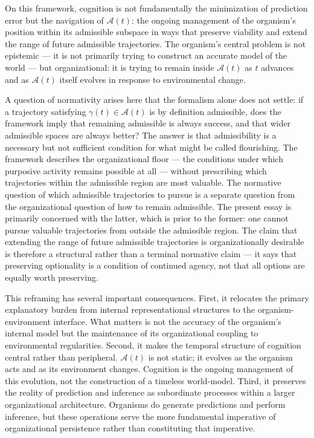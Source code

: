 \documentclass[12pt,a4paper]{report}
\theoremstyle{flyxion}
\begin{document}
On this framework, cognition is not fundamentally the minimization of prediction error but the navigation of $\mathcal{A}(t)$: the ongoing management of the organism's position within its admissible subspace in ways that preserve viability and extend the range of future admissible trajectories. The organism's central problem is not epistemic --- it is not primarily trying to construct an accurate model of the world --- but organizational: it is trying to remain inside $\mathcal{A}(t)$ as $t$ advances and as $\mathcal{A}(t)$ itself evolves in response to environmental change.

A question of normativity arises here that the formalism alone does not settle: if a trajectory satisfying $\gamma(t) \in \mathcal{A}(t)$ is by definition admissible, does the framework imply that remaining admissible is always success, and that wider admissible spaces are always better? The answer is that admissibility is a necessary but not sufficient condition for what might be called flourishing. The framework describes the organizational floor --- the conditions under which purposive activity remains possible at all --- without prescribing which trajectories within the admissible region are most valuable. The normative question of which admissible trajectories to pursue is a separate question from the organizational question of how to remain admissible. The present essay is primarily concerned with the latter, which is prior to the former: one cannot pursue valuable trajectories from outside the admissible region. The claim that extending the range of future admissible trajectories is organizationally desirable is therefore a structural rather than a terminal normative claim --- it says that preserving optionality is a condition of continued agency, not that all options are equally worth preserving.

This reframing has several important consequences. First, it relocates the primary explanatory burden from internal representational structures to the organism-environment interface. What matters is not the accuracy of the organism's internal model but the maintenance of its organizational coupling to environmental regularities. Second, it makes the temporal structure of cognition central rather than peripheral. $\mathcal{A}(t)$ is not static; it evolves as the organism acts and as its environment changes. Cognition is the ongoing management of this evolution, not the construction of a timeless world-model. Third, it preserves the reality of prediction and inference as subordinate processes within a larger organizational architecture. Organisms do generate predictions and perform inference, but these operations serve the more fundamental imperative of organizational persistence rather than constituting that imperative.
\end{document}
